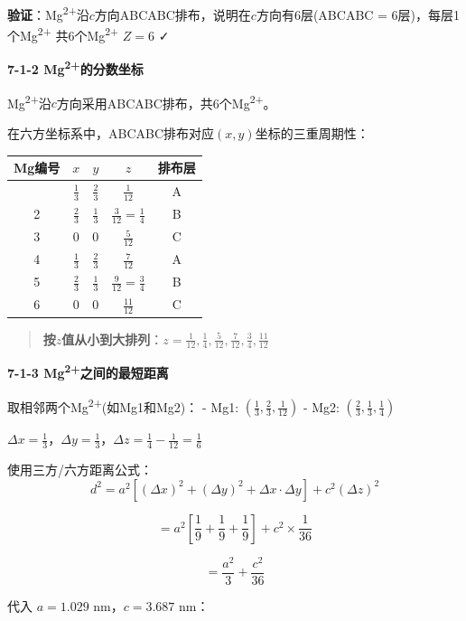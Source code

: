 \textbf{验证}：Mg\textsuperscript{2+}沿\(c\)方向ABCABC排布，说明在\(c\)方向有6层(ABCABC = 6层)，每层1个Mg\textsuperscript{2+} \箭 共6个Mg\textsuperscript{2+} \箭 \(Z = 6\) ✓

\textbf{7-1-2 Mg\textsuperscript{2+}的分数坐标}

Mg\textsuperscript{2+}沿\(c\)方向采用ABCABC排布，共6个Mg\textsuperscript{2+}。

在六方坐标系中，ABCABC排布对应\((x, y)\)坐标的三重周期性：

{\def\LTcaptype{none} %
\begin{longtable}[]{@{}ccccc@{}}
\toprule\noalign{}
Mg编号 & \(x\) & \(y\) & \(z\) & 排布层 \\
\midrule\noalign{}
\endhead
\bottomrule\noalign{}
\endlastfoot
1 & \(\frac{1}{3}\) & \(\frac{2}{3}\) & \(\frac{1}{12}\) & A \\
2 & \(\frac{2}{3}\) & \(\frac{1}{3}\) & \(\frac{3}{12} = \frac{1}{4}\) & B \\
3 & \(0\) & \(0\) & \(\frac{5}{12}\) & C \\
4 & \(\frac{1}{3}\) & \(\frac{2}{3}\) & \(\frac{7}{12}\) & A \\
5 & \(\frac{2}{3}\) & \(\frac{1}{3}\) & \(\frac{9}{12} = \frac{3}{4}\) & B \\
6 & \(0\) & \(0\) & \(\frac{11}{12}\) & C \\
\end{longtable}
}

\begin{quote}
\textbf{按\(z\)值从小到大排列}：\(z = \frac{1}{12}, \frac{1}{4}, \frac{5}{12}, \frac{7}{12}, \frac{3}{4}, \frac{11}{12}\)
\end{quote}

\textbf{7-1-3 Mg\textsuperscript{2+}之间的最短距离}

取相邻两个Mg\textsuperscript{2+}(如Mg1和Mg2)：
- Mg1: \((\frac{1}{3}, \frac{2}{3}, \frac{1}{12})\)
- Mg2: \((\frac{2}{3}, \frac{1}{3}, \frac{1}{4})\)

\(\Delta x = \frac{1}{3}\)，\(\Delta y = \frac{1}{3}\)，\(\Delta z = \frac{1}{4} - \frac{1}{12} = \frac{1}{6}\)

使用三方/六方距离公式：
\[d^2 = a^2[(\Delta x)^2 + (\Delta y)^2 + \Delta x \cdot \Delta y] + c^2(\Delta z)^2\]

\[= a^2\left[\frac{1}{9} + \frac{1}{9} + \frac{1}{9}\right] + c^2 \times \frac{1}{36}\]

\[= \frac{a^2}{3} + \frac{c^2}{36}\]

代入 \(a = 1.029\) nm，\(c = 3.687\) nm：

